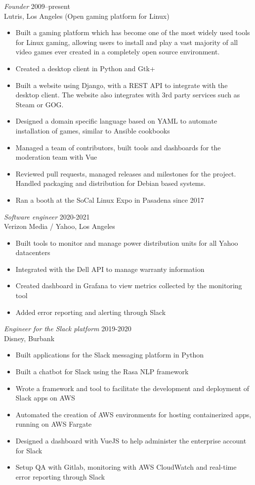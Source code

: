 \documentclass[line,resmargin]{res}
\begin{document}
\begin{resume}
{\sl Founder\/} \hfill 2009--present\\
Lutris, Los Angeles (Open gaming platform for Linux)
\begin{itemize} \itemsep -2pt
\item Built a gaming platform which has become one of the most widely used tools for Linux gaming, allowing users to install and play a vast majority of all video games ever created in a completely open source environment.
\item Created a desktop client in Python and Gtk+
\item Built a website using Django, with a REST API to integrate with the desktop client. The website also integrates with 3rd party services such as Steam or GOG.
\item Designed a domain specific language based on YAML to automate installation of games, similar to Ansible cookbooks
\item Managed a team of contributors, built tools and dashboards for the moderation team with Vue
\item Reviewed pull requests, managed releases and milestones for the project. Handled packaging and distribution for Debian based systems.
\item Ran a booth at the SoCal Linux Expo in Pasadena since 2017
\end{itemize}

{\sl Software engineer\/} \hfill 2020-2021\\
Verizon Media / Yahoo, Los Angeles
\begin{itemize} \itemsep -2pt
\item Built tools to monitor and manage power distribution units for all Yahoo datacenters
\item Integrated with the Dell API to manage warranty information
\item Created dashboard in Grafana to view metrics collected by the monitoring tool
\item Added error reporting and alerting through Slack
\end{itemize}

{\sl Engineer for the Slack platform\/} \hfill 2019-2020\\
Disney, Burbank
\begin{itemize} \itemsep -2pt
\item Built applications for the Slack messaging platform in Python
\item Built a chatbot for Slack using the Rasa NLP framework
\item Wrote a framework and tool to facilitate the development and deployment of Slack apps on AWS
\item Automated the creation of AWS environments for hosting containerized apps, running on AWS Fargate
\item Designed a dashboard with VueJS to help administer the enterprise account for Slack
\item Setup QA with Gitlab, monitoring with AWS CloudWatch and real-time error reporting through Slack
\end{itemize}


\end{resume}
\end{document}
